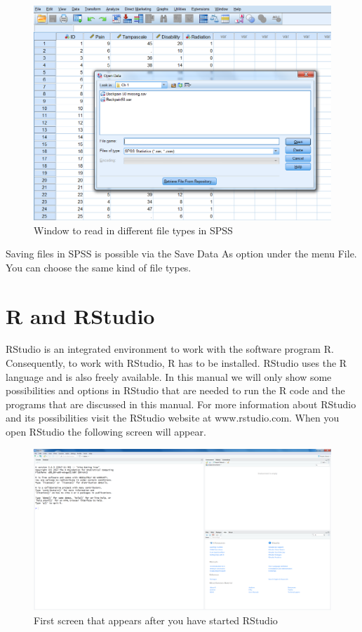 \documentclass[]{book}
\begin{document}
\begin{figure}

{\centering \includegraphics[width=0.95\linewidth]{images/fig1.8} 

}

\caption{Window to read in different file types in SPSS}\label{fig:fig8}
\end{figure}

Saving files in SPSS is possible via the Save Data As option under the
menu File. You can choose the same kind of file types.

\section{R and RStudio}\label{r-and-rstudio}

RStudio is an integrated environment to work with the software program
R. Consequently, to work with RStudio, R has to be installed. RStudio
uses the R language and is also freely available. In this manual we will
only show some possibilities and options in RStudio that are needed to
run the R code and the programs that are discussed in this manual. For
more information about RStudio and its possibilities visit the RStudio
website at www.rstudio.com. When you open RStudio the following screen
will appear.

\begin{figure}

{\centering \includegraphics[width=0.95\linewidth]{images/fig1.10} 

}

\caption{First screen that appears after you have started RStudio}\label{fig:fig10}
\end{figure}
\end{document}
